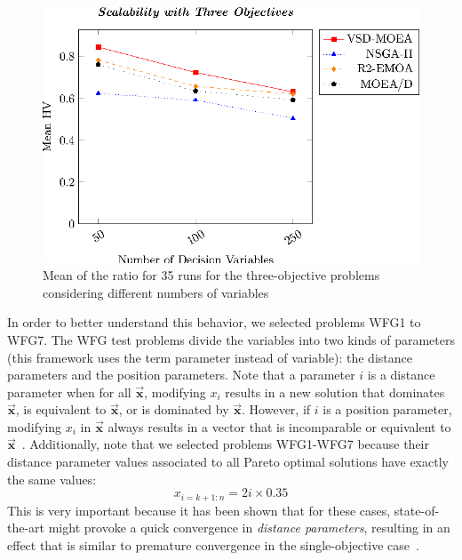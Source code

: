 \begin{figure}[t]
\centering
\includegraphics[scale=0.85]{Images/Graphic-Scalability-3obj_tikz-figure0.eps}
\caption{Mean of the \HV{} ratio for 35 runs for the three-objective problems considering different numbers of variables} \label{fig:variable-decision-scalability-3obj}
\end{figure}

In order to better understand this behavior, we selected problems WFG1 to WFG7.
%
The WFG test problems divide the variables into two kinds of parameters (this framework uses the term parameter instead of 
variable): the distance parameters and the position parameters.
%
Note that a parameter $i$ is a distance parameter when for all $\vec{\mathbf{x}}$, modifying $x_i$ results in a new solution 
that dominates $\vec{\mathbf{x}}$, is equivalent to $\vec{\mathbf{x}}$, or is dominated by $\vec{\mathbf{x}}$.
%
However, if $i$ is a position parameter, modifying $x_i$ in $\vec{\mathbf{x}}$ always results in a vector that is incomparable or 
equivalent to $\vec{\mathbf{x}}$~\cite{huband2005scalable}.
%
Additionally, note that we selected problems WFG1-WFG7 because their distance parameter values associated to all Pareto optimal solutions 
have exactly the same values:
%
\begin{equation}
   x_{i=k+1:n} = 2i \times 0.35
\end{equation}
%
This is very important because it has been shown that for these cases, state-of-the-art
\MOEAS{} might provoke a quick convergence in \textit{distance parameters}, resulting in an effect that is similar to premature convergence
in the single-objective case~\cite{Joel:GDE3_CEC09}.

